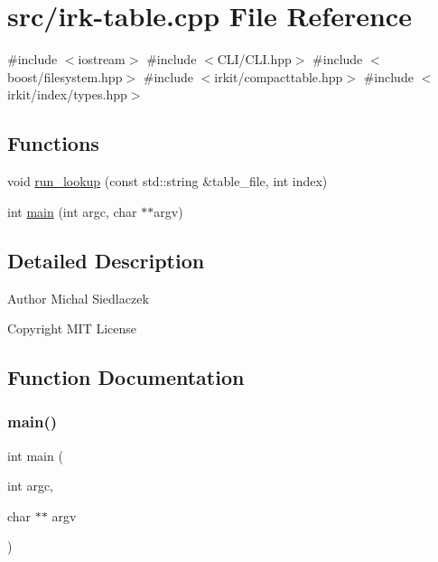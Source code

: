 \hypertarget{irk-table_8cpp}{}\section{src/irk-\/table.cpp File Reference}
\label{irk-table_8cpp}
{\ttfamily \#include $<$iostream$>$}\newline
{\ttfamily \#include $<$C\+L\+I/\+C\+L\+I.\+hpp$>$}\newline
{\ttfamily \#include $<$boost/filesystem.\+hpp$>$}\newline
{\ttfamily \#include $<$irkit/compacttable.\+hpp$>$}\newline
{\ttfamily \#include $<$irkit/index/types.\+hpp$>$}\newline
\subsection*{Functions}
\begin{DoxyCompactItemize}
\item 
void \mbox{\hyperlink{irk-table_8cpp_a6dc9753a6d1833cacd9965926b26d57d}{run\+\_\+lookup}} (const std\+::string \&table\+\_\+file, int index)
\item 
int \mbox{\hyperlink{irk-table_8cpp_a3c04138a5bfe5d72780bb7e82a18e627}{main}} (int argc, char $\ast$$\ast$argv)
\end{DoxyCompactItemize}


\subsection{Detailed Description}
\begin{DoxyAuthor}{Author}
Michal Siedlaczek 
\end{DoxyAuthor}
\begin{DoxyCopyright}{Copyright}
M\+IT License 
\end{DoxyCopyright}


\subsection{Function Documentation}
\mbox{\label{irk-table_8cpp_a3c04138a5bfe5d72780bb7e82a18e627}} 
\subsubsection{\texorpdfstring{main()}{main()}}
{\footnotesize\ttfamily int main (\begin{DoxyParamCaption}\item[{int}]{argc,  }\item[{char $\ast$$\ast$}]{argv }\end{DoxyParamCaption})}

